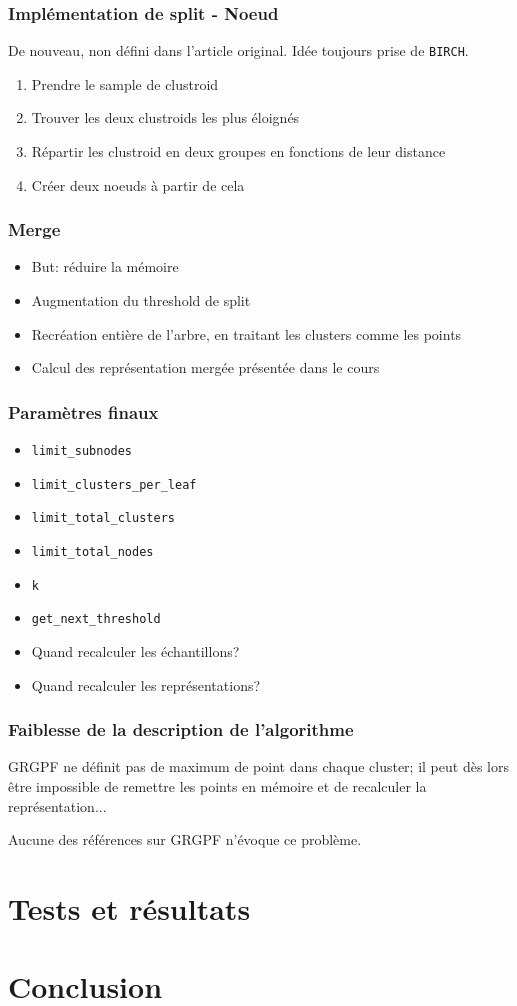 \documentclass{beamer}
\begin{document}
 	\begin{frame}
 		\frametitle{Implémentation de split - Noeud}
 		De nouveau, non défini dans l'article original. Idée toujours prise de \texttt{BIRCH}.
 		\begin{enumerate}
 			\item Prendre le sample de clustroid
 			\item Trouver les deux clustroids les plus éloignés
 			\item Répartir les clustroid en deux groupes en fonctions de leur distance
 			\item Créer deux noeuds à partir de cela
 		\end{enumerate}
 	\end{frame}
 	
 	\begin{frame}
 		\frametitle{Merge}
 		\begin{itemize}
 			\item But: réduire la mémoire
 			\item Augmentation du threshold de split
 			\item Recréation entière de l'arbre, en traitant les clusters comme les points
 			\item Calcul des représentation mergée présentée dans le cours
 		\end{itemize}
 	\end{frame}
 	
 	\begin{frame}
 		\frametitle{Paramètres finaux}
 		\begin{itemize}
 			\item \texttt{limit\_subnodes}
 			\item \texttt{limit\_clusters\_per\_leaf}
 			\item \texttt{limit\_total\_clusters}
 			\item \texttt{limit\_total\_nodes}
 			\item \texttt{k}
 			\item \texttt{get\_next\_threshold}
 			\item Quand recalculer les échantillons?
 			\item Quand recalculer les représentations?
 		\end{itemize}
 	\end{frame}
 	
 	\begin{frame}
 		\frametitle{Faiblesse de la description de l'algorithme}
 		GRGPF ne définit pas de maximum de point dans chaque cluster; il peut dès lors être impossible de remettre les points en mémoire et de recalculer la représentation...
 		
 		Aucune des références sur GRGPF n'évoque ce problème.
 	\end{frame}
 	\section{Tests et résultats}
 	\section{Conclusion}
\end{document}
